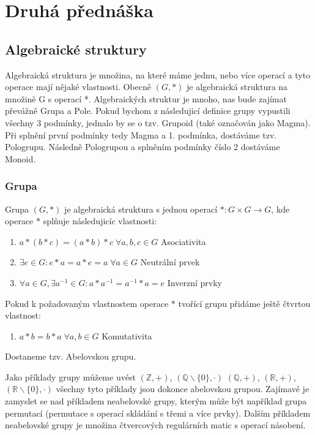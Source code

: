 \section{Druhá přednáška}

\subsection{Algebraické struktury}
Algebraická struktura je množina, na které máme jednu, nebo více operací
a tyto operace mají nějaké vlastnosti. Obecně $(G, *)$ je algebraická
struktura na množině G s operací *. Algebraických struktur je mnoho, nas bude
zajímat převážně Grupa a Pole. Pokud bychom z následujicí definice grupy vypustili
všechny 3 podmínky, jednalo by se o tzv. Grupoid (také označován jako Magma). Při splnění první
podmínky tedy Magma a 1. podmínka, dostáváme tzv. Pologrupu. Následně Pologrupou a
splněním podmínky číslo 2 dostáváme Monoid.

\subsubsection{Grupa}
\begin{definition}[Grupa]
    Grupa $(G, *)$ je algebraická struktura s jednou operací $*: G \times G \rightarrow G$,
    kde operace $*$ splňuje následujicíc vlastnosti:
    \begin{enumerate}
        \item $a * (b * c) = (a * b) * c \; \forall a, b, c \in G$ \hfill Asociativita
        \item $\exists e \in G: e * a = a * e = a \; \forall a \in G$ \hfill Neutrální prvek
        \item $\forall a \in G, \exists a^{-1} \in G: a * a^{-1} = a^{-1} * a = e$ \hfill
        Inverzní prvky
    \end{enumerate}
\end{definition}

\begin{definition}
    Pokud k požadovaným vlastnostem operace $*$ tvořící grupu přidáme ještě
    čtvrtou vlastnost:
    \begin{enumerate}[start=4]
        \item $a * b = b * a \; \forall a, b \in G$ \hfill Komutativita
    \end{enumerate}
    Dostaneme tzv. Abelovskou grupu.
\end{definition}

Jako příklady grupy můžeme uvést $(\mathbb{Z, +})$, $(\mathbb{Q} \smallsetminus \{0\}, \cdot)$
$(\mathbb{Q}, +)$, $(\mathbb{R}, +)$, $(\mathbb{R} \smallsetminus \{0\}, \cdot)$
všechny tyto příklady jsou dokonce abelovskou grupou. Zajímavé je zamyslet se nad příkladem
neabelovské grupy, kterým může být například grupa permutací (permutace s operací skládání s třemi
a více prvky). Dalším příkladem neabelovské grupy je množina čtvercových regulárních matic s operací
násobení.


